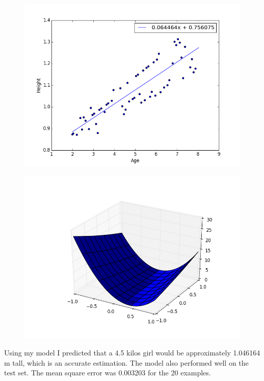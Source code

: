 \documentclass{article}
\begin{document}
\begin{figure}[htb]
\centering
\begin{minipage}{.5\textwidth}
  \centering
  \includegraphics[width=1.0\linewidth]{regression_line}
  \label{regressionline}
\end{minipage}%
\begin{minipage}{.5\textwidth}
  \centering
  \includegraphics[width=1.0\linewidth]{p1_cost_function}
  \label{costfunction}
\end{minipage}
\end{figure}


Using my model I predicted that a 4.5 kilos girl would be approximately 1.046164 m tall, which is an accurate estimation. The model also performed well on the test set. The mean square error was 0.003203 for the 20 examples.
\end{document}
